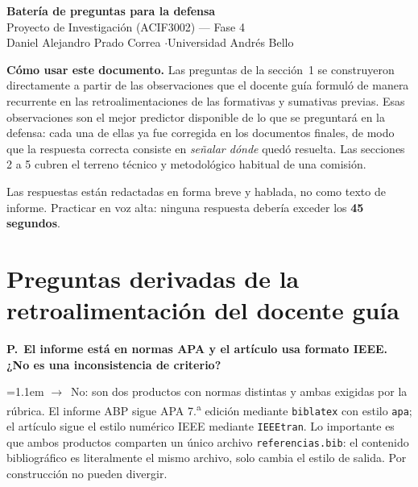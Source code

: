 \documentclass[11pt,letterpaper,oneside]{article}
\newcounter{preg}
\newcommand{\pregunta}[1]{%
  \refstepcounter{preg}%
  \vspace{0.6em}%
  {\bfseries\color{rojo} P\thepreg.}\ {\bfseries #1}\par\vspace{0.15em}%
}
\newcommand{\resp}[1]{%
  \begingroup\color{gris}\small\hangindent=1.1em\hangafter=0%
  \textbf{$\rightarrow$}\ #1\par\endgroup\vspace{0.1em}%
}
\begin{document}
\begin{center}
{\LARGE\bfseries\color{navy} Batería de preguntas para la defensa}\\[0.4em]
{\large Proyecto de Investigación (ACIF3002) --- Fase 4}\\[0.3em]
{\color{gris} Daniel Alejandro Prado Correa \quad$\cdot$\quad Universidad Andrés Bello}
\end{center}

\vspace{0.8em}

\begin{mdframed}[backgroundcolor=fondo,linewidth=0pt,innertopmargin=8pt,
                 innerbottommargin=8pt,innerleftmargin=10pt,innerrightmargin=10pt]
\small
\textbf{Cómo usar este documento.} Las preguntas de la sección~1 se construyeron
directamente a partir de las observaciones que el docente guía formuló de manera
recurrente en las retroalimentaciones de las formativas y sumativas previas. Esas
observaciones son el mejor predictor disponible de lo que se preguntará en la
defensa: cada una de ellas ya fue corregida en los documentos finales, de modo
que la respuesta correcta consiste en \emph{señalar dónde} quedó resuelta. Las
secciones 2 a 5 cubren el terreno técnico y metodológico habitual de una comisión.

\smallskip
Las respuestas están redactadas en forma breve y hablada, no como texto de
informe. Practicar en voz alta: ninguna respuesta debería exceder los
\textbf{45 segundos}.
\end{mdframed}

\section{Preguntas derivadas de la retroalimentación del docente guía}

\pregunta{El informe está en normas APA y el artículo usa formato IEEE. ¿No es
una inconsistencia de criterio?}
\resp{No: son dos productos con normas distintas y ambas exigidas por la
rúbrica. El informe ABP sigue APA 7.\textsuperscript{a} edición mediante
\texttt{biblatex} con estilo \texttt{apa}; el artículo sigue el estilo numérico
IEEE mediante \texttt{IEEEtran}. Lo importante es que ambos productos comparten
un único archivo \texttt{referencias.bib}: el contenido bibliográfico es
literalmente el mismo archivo, solo cambia el estilo de salida. Por construcción
no pueden divergir.}
\end{document}
